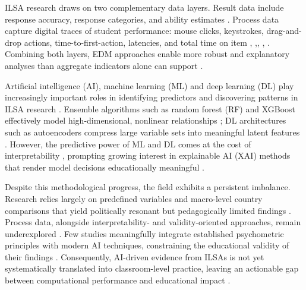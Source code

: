 \documentclass{ieeeaccess}
\begin{document}
ILSA research draws on two complementary data layers. Result data include response accuracy, response categories, and ability estimates \cite{fn-aydin-etal2025, goldhammer-etal2020}. Process data capture digital traces of student performance: mouse clicks, keystrokes, drag-and-drop actions, time-to-first-action, latencies, and total time on item \cite{huang-etal2025}, \cite{anghel-etal2024},\cite{oecdUsesProcessData2023a}, \cite{ding-etal2025}, \cite{ulitzsch-etal2021}. Combining both layers, EDM approaches enable more robust and explanatory analyses than aggregate indicators alone can support \cite{ang-etal2020}.

Artificial intelligence (AI), machine learning (ML) and deep learning (DL) play increasingly important roles in identifying predictors and discovering patterns in ILSA research \cite{khine-etal2025}. Ensemble algorithms such as random forest (RF) and XGBoost effectively model high-dimensional, nonlinear relationships \cite{acisli-celik-yesilkanat2023, zhu-etal2025}; DL architectures such as autoencoders compress large variable sets into meaningful latent features \cite{elouafi-etal2025, tang-etal2021}. However, the predictive power of ML and DL comes at the cost of interpretability \cite{khine-etal2025}, prompting growing interest in explainable AI (XAI) methods that render model decisions educationally meaningful \cite{gomez-talal-etal2025, hu-etal-Predicting-Adolescents-2025}.

Despite this methodological progress, the field exhibits a persistent imbalance. Research relies largely on predefined variables and macro-level country comparisons that yield politically resonant but pedagogically limited findings \cite{wang-etal2022}. Process data, alongside interpretability- and validity-oriented approaches, remain underexplored \cite{salles-etal2020}. Few studies meaningfully integrate established psychometric principles with modern AI techniques, constraining the educational validity of their findings \cite{huang-etal2025}. Consequently, AI-driven evidence from ILSAs is not yet systematically translated into classroom-level practice, leaving an actionable gap between computational performance and educational impact \cite{maia-etal023}.
\end{document}

